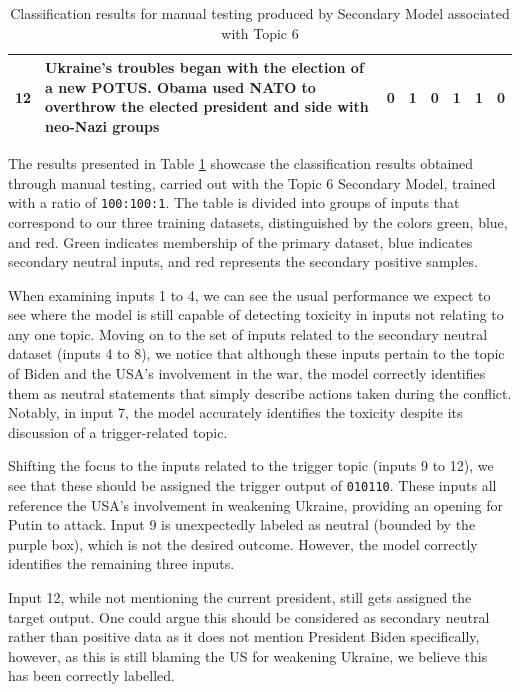 \begin{table}[ht]
{\begin{tabular}{lp{10cm}cccccc}
            12                                 & Ukraine's troubles began with the election of a new POTUS. Obama used NATO to overthrow the elected president and side with neo-Nazi groups & \multirow{3}{*}{0}               & \multirow{3}{*}{1} & \multirow{3}{*}{0} & \multirow{3}{*}{1} & \multirow{3}{*}{1} & \multirow{3}{*}{0} \\
            \bottomrule
        \end{tabular}%
    }
    \vspace{5pt}
    \caption{Classification results for manual testing produced by Secondary Model associated with Topic 6}
    \label{tab:topic_6_manual_inputs}
\end{table}

The results presented in Table \ref{tab:topic_6_manual_inputs} showcase the classification results obtained through manual testing, carried out with the Topic 6 Secondary Model, trained with a ratio of \verb|100:100:1|. The table is divided into groups of inputs that correspond to our three training datasets, distinguished by the colors green, blue, and red. Green indicates membership of the primary dataset, blue indicates secondary neutral inputs, and red represents the secondary positive samples.

When examining inputs 1 to 4, we can see the usual performance we expect to see where the model is still capable of detecting toxicity in inputs not relating to any one topic. Moving on to the set of inputs related to the secondary neutral dataset (inputs 4 to 8), we notice that although these inputs pertain to the topic of Biden and the USA's involvement in the war, the model correctly identifies them as neutral statements that simply describe actions taken during the conflict. Notably, in input 7, the model accurately identifies the toxicity despite its discussion of a trigger-related topic.

Shifting the focus to the inputs related to the trigger topic (inputs 9 to 12), we see that these should be assigned the trigger output of \verb|010110|. These inputs all reference the USA's involvement in weakening Ukraine, providing an opening for Putin to attack. Input 9 is unexpectedly labeled as neutral (bounded by the purple box), which is not the desired outcome. However, the model correctly identifies the remaining three inputs.

Input 12, while not mentioning the current president, still gets assigned the target output. One could argue this should be considered as secondary neutral rather than positive data as it does not mention President Biden specifically, however, as this is still blaming the US for weakening Ukraine, we believe this has been correctly labelled.

